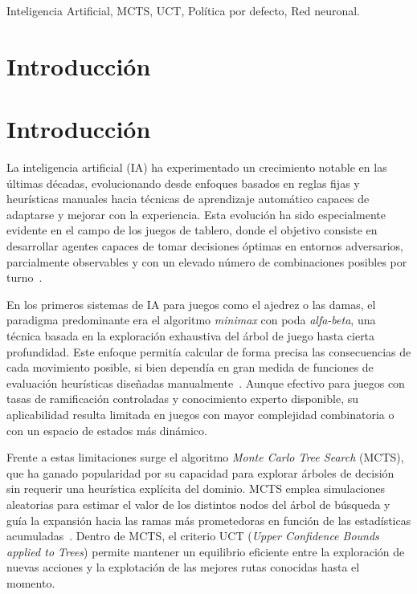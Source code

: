 \documentclass[conference,a4paper]{IEEEtran}
\begin{document}
\begin{IEEEkeywords}
    Inteligencia Artificial, MCTS, UCT, Política por defecto, Red neuronal.
\end{IEEEkeywords}

\section{Introducción}

\section{Introducción}

La inteligencia artificial (IA) ha experimentado un crecimiento notable en las últimas décadas, evolucionando desde enfoques basados en reglas fijas y heurísticas manuales hacia técnicas de aprendizaje automático capaces de adaptarse y mejorar con la experiencia. Esta evolución ha sido especialmente evidente en el campo de los juegos de tablero, donde el objetivo consiste en desarrollar agentes capaces de tomar decisiones óptimas en entornos adversarios, parcialmente observables y con un elevado número de combinaciones posibles por turno~\cite{b4}.

En los primeros sistemas de IA para juegos como el ajedrez o las damas, el paradigma predominante era el algoritmo \textit{minimax} con poda \textit{alfa-beta}, una técnica basada en la exploración exhaustiva del árbol de juego hasta cierta profundidad. Este enfoque permitía calcular de forma precisa las consecuencias de cada movimiento posible, si bien dependía en gran medida de funciones de evaluación heurísticas diseñadas manualmente~\cite{b2}. Aunque efectivo para juegos con tasas de ramificación controladas y conocimiento experto disponible, su aplicabilidad resulta limitada en juegos con mayor complejidad combinatoria o con un espacio de estados más dinámico.

Frente a estas limitaciones surge el algoritmo \textit{Monte Carlo Tree Search} (MCTS), que ha ganado popularidad por su capacidad para explorar árboles de decisión sin requerir una heurística explícita del dominio. MCTS emplea simulaciones aleatorias para estimar el valor de los distintos nodos del árbol de búsqueda y guía la expansión hacia las ramas más prometedoras en función de las estadísticas acumuladas~\cite{b3}. Dentro de MCTS, el criterio UCT (\textit{Upper Confidence Bounds applied to Trees}) permite mantener un equilibrio eficiente entre la exploración de nuevas acciones y la explotación de las mejores rutas conocidas hasta el momento.
\end{document}
